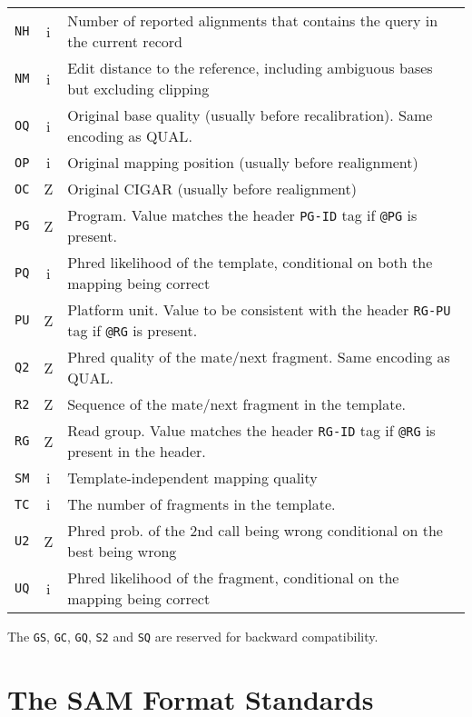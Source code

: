 \documentclass[10pt]{article}
\begin{document}
\begin{center}
\begin{tabular}{ccp{12.5cm}}
  {\tt NH} & i & Number of reported alignments that contains the query in the current record\\
  {\tt NM} & i & Edit distance to the reference, including ambiguous bases but excluding clipping \\
  {\tt OQ} & i & Original base quality (usually before recalibration). Same encoding as {\sf QUAL}.\\
  {\tt OP} & i & Original mapping position (usually before realignment) \\
  {\tt OC} & Z & Original CIGAR (usually before realignment) \\
  {\tt PG} & Z & Program. Value matches the header {\tt PG-ID} tag if {\tt @PG} is present. \\
  {\tt PQ} & i & Phred likelihood of the template, conditional on both the mapping being correct \\
  {\tt PU} & Z & Platform unit. Value to be consistent with the header {\tt RG-PU} tag if {\tt @RG} is present.\\
  {\tt Q2} & Z & Phred quality of the mate/next fragment. Same encoding as {\sf QUAL}.\\
  {\tt R2} & Z & Sequence of the mate/next fragment in the template. \\
  {\tt RG} & Z & Read group. Value matches the header {\tt RG-ID} tag if {\tt @RG} is present in the header. \\
  {\tt SM} & i & Template-independent mapping quality \\
  {\tt TC} & i & The number of fragments in the template.\\
  {\tt U2} & Z & Phred prob. of the 2nd call being wrong conditional on the best being wrong \\
  {\tt UQ} & i & Phred likelihood of the fragment, conditional on the mapping being correct \\
  \hline
\end{tabular}
\end{center}
The {\tt GS}, {\tt GC}, {\tt GQ}, {\tt S2} and {\tt SQ} are reserved for
backward compatibility.
\pagebreak
\section{The SAM Format Standards}
\end{document}
